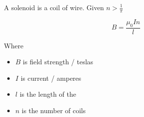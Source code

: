 \documentclass{article}
\begin{document}
A solenoid is a coil of wire. Given $n>\frac{1}{\pi}$

\[B=\frac{\mu_0In}{l}\] %

\noindent Where\begin{itemize}

    \item $B$ is field strength / teslas
    \item $I$ is current / amperes
    \item $l$ is the length of the 
    \item $n$ is the number of coils

\end{itemize}
\end{document}
